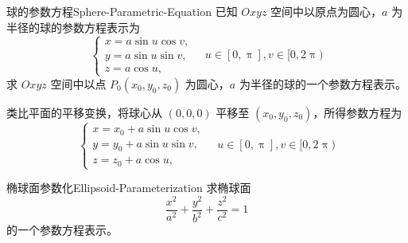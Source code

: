 \begin{problem}{球的参数方程}{Sphere-Parametric-Equation}
    已知 $Oxyz$ 空间中以原点为圆心，$a$ 为半径的球的参数方程表示为
    \begin{equation*}
        \begin{cases}
            x = a \sin u \cos v, \\
            y = a \sin u \sin v, \\
            z = a \cos u,
        \end{cases} \quad u \in [0, \uppi], v \in [0, 2\uppi)
    \end{equation*}
    求 $Oxyz$ 空间中以点 $P_0(x_0, y_0, z_0)$ 为圆心，$a$ 为半径的球的一个参数方程表示。
\end{problem}

\begin{solution}
    类比平面的平移变换，将球心从 $(0, 0, 0)$ 平移至 $(x_0, y_0, z_0)$，所得参数方程为
    \begin{equation*}
        \boxed{
        \begin{cases}
            x = x_0 + a \sin u \cos v, \\
            y = y_0 + a \sin u \sin v, \\
            z = z_0 + a \cos u,
        \end{cases} \quad u \in [0, \uppi], v \in [0, 2\uppi)
        }
    \end{equation*}
\end{solution}


\begin{problem}{椭球面参数化}{Ellipsoid-Parameterization}
    求椭球面
    \begin{equation*}
        \frac{x^2}{a^2} + \frac{y^2}{b^2} + \frac{z^2}{c^2} = 1
    \end{equation*}
    的一个参数方程表示。
\end{problem}

